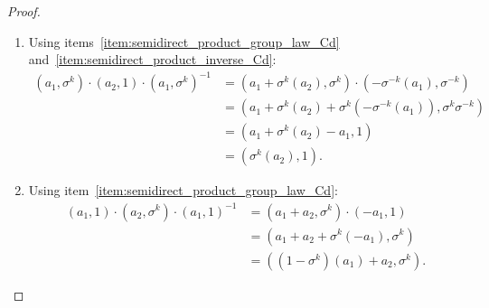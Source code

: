 \begin{proof}
\begin{enumerate}
        \item Using items~\ref{item:semidirect_product_group_law_Cd} and~\ref{item:semidirect_product_inverse_Cd}:
            \begin{align*}
                (a_1, \sigma^k) \cdot (a_2, 1) \cdot (a_1, \sigma^k)^{-1}
                &= (a_1 + \sigma^k(a_2), \sigma^k) \cdot (-\sigma^{-k}(a_1), \sigma^{-k}) \\
                &= (a_1 + \sigma^k(a_2) + \sigma^k(-\sigma^{-k}(a_1)), \sigma^k \sigma^{-k}) \\
                &= (a_1 + \sigma^k(a_2) - a_1, 1) \\
                &= (\sigma^k(a_2), 1).
            \end{align*}

        \item Using item~\ref{item:semidirect_product_group_law_Cd}:
            \begin{align*}
                (a_1, 1) \cdot (a_2, \sigma^k) \cdot (a_1, 1)^{-1}
                &= (a_1 + a_2, \sigma^k) \cdot (-a_1, 1) \\
                &= (a_1 + a_2 + \sigma^k(-a_1), \sigma^k) \\
                &= ((1 - \sigma^k)(a_1) + a_2, \sigma^k).
            \end{align*}
    \end{enumerate}
\end{proof}
